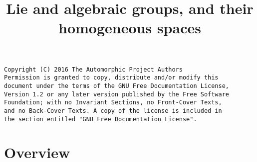 

%

\newcommand{\TAG}{ZZZZ}

\title{Lie and algebraic groups, and their homogeneous spaces}


\maketitle

\label{section-phantom}
\hypertarget{0200}{}
\reversemarginpar{}

\begin{verbatim}
Copyright (C) 2016 The Automorphic Project Authors
Permission is granted to copy, distribute and/or modify this
document under the terms of the GNU Free Documentation License,
Version 1.2 or any later version published by the Free Software
Foundation; with no Invariant Sections, no Front-Cover Texts,
and no Back-Cover Texts. A copy of the license is included in
the section entitled "GNU Free Documentation License".
\end{verbatim}

\tableofcontents


\section{Overview}
\label{section-overview}
\hypertarget{0201}{}
\reversemarginpar{}

\noindent









